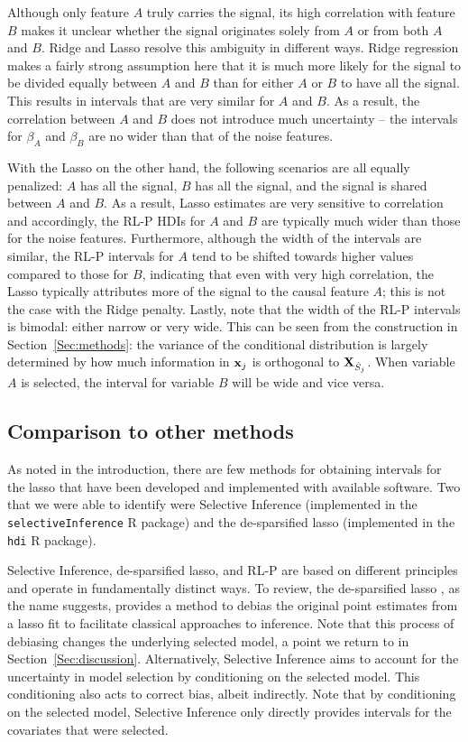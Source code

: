 Although only feature $A$ truly carries the signal, its high correlation with feature $B$ makes it unclear whether the signal originates solely from $A$ or from both $A$ and $B$. Ridge and Lasso resolve this ambiguity in different ways. Ridge regression makes a fairly strong assumption here that it is much more likely for the signal to be divided equally between $A$ and $B$ than for either $A$ or $B$ to have all the signal. This results in intervals that are very similar for $A$ and $B$. As a result, the correlation between $A$ and $B$ does not introduce much uncertainty -- the intervals for $\beta_A$ and $\beta_B$ are no wider than that of the noise features.

With the Lasso on the other hand, the following scenarios are all equally penalized: $A$ has all the signal, $B$ has all the signal, and the signal is shared between $A$ and $B$. As a result, Lasso estimates are very sensitive to correlation and accordingly, the RL-P HDIs for $A$ and $B$ are typically much wider than those for the noise features. Furthermore, although the width of the intervals are similar, the RL-P intervals for $A$ tend to be shifted towards higher values compared to those for $B$, indicating that even with very high correlation, the Lasso typically attributes more of the signal to the causal feature $A$; this is not the case with the Ridge penalty. Lastly, note that the width of the RL-P intervals is bimodal: either narrow or very wide. This can be seen from the construction in Section~\ref{Sec:methods}: the variance of the conditional distribution is largely determined by how much information in $\mathbf{x}_j$ is orthogonal to $\mathbf{X}_{\hat{S}_j}$. When variable $A$ is selected, the interval for variable $B$ will be wide and vice versa.

\subsection{Comparison to other methods} \label{Sec:Comparison}

As noted in the introduction, there are few methods for obtaining intervals for the lasso that have been developed and implemented with available software. Two that we were able to identify were Selective Inference (implemented in the \texttt{selectiveInference} R package) and the de-sparsified lasso (implemented in the \texttt{hdi} R package).

Selective Inference, de-sparsified lasso, and RL-P are based on different principles and operate in fundamentally distinct ways. To review, the de-sparsified lasso \citep{ZhangZhang2014}, as the name suggests, provides a method to debias the original point estimates from a lasso fit to facilitate classical approaches to inference. Note that this process of debiasing changes the underlying selected model, a point we return to in Section~\ref{Sec:discussion}. Alternatively, Selective Inference \citep{Lee2016,Tibshirani2016} aims to account for the uncertainty in model selection by conditioning on the selected model. This conditioning also acts to correct bias, albeit indirectly. Note that by conditioning on the selected model, Selective Inference only directly provides intervals for the covariates that were selected.

